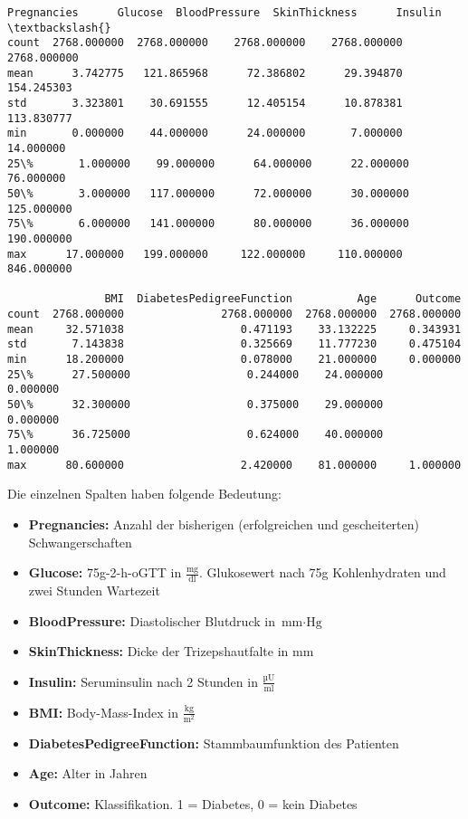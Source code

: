 \documentclass[11.5pt]{article}
\makeatletter
\providecommand{\tightlist}{%
      \setlength{\itemsep}{0pt}\setlength{\parskip}{0pt}}
\newcommand{\boxspacing}{\kern\kvtcb@left@rule\kern\kvtcb@boxsep}
\newcommand{\prompt}[4]{
        {\ttfamily\llap{{\color{#2}[#3]:\hspace{3pt}#4}}\vspace{-\baselineskip}}
    }
\makeatother
\begin{document}
            \begin{tcolorbox}[breakable, size=fbox, boxrule=.5pt, pad at break*=1mm, opacityfill=0]
\prompt{Out}{outcolor}{5}{\boxspacing}
\begin{Verbatim}[commandchars=\\\{\}]
       Pregnancies      Glucose  BloodPressure  SkinThickness      Insulin  \textbackslash{}
count  2768.000000  2768.000000    2768.000000    2768.000000  2768.000000
mean      3.742775   121.865968      72.386802      29.394870   154.245303
std       3.323801    30.691555      12.405154      10.878381   113.830777
min       0.000000    44.000000      24.000000       7.000000    14.000000
25\%       1.000000    99.000000      64.000000      22.000000    76.000000
50\%       3.000000   117.000000      72.000000      30.000000   125.000000
75\%       6.000000   141.000000      80.000000      36.000000   190.000000
max      17.000000   199.000000     122.000000     110.000000   846.000000

               BMI  DiabetesPedigreeFunction          Age      Outcome
count  2768.000000               2768.000000  2768.000000  2768.000000
mean     32.571038                  0.471193    33.132225     0.343931
std       7.143838                  0.325669    11.777230     0.475104
min      18.200000                  0.078000    21.000000     0.000000
25\%      27.500000                  0.244000    24.000000     0.000000
50\%      32.300000                  0.375000    29.000000     0.000000
75\%      36.725000                  0.624000    40.000000     1.000000
max      80.600000                  2.420000    81.000000     1.000000
\end{Verbatim}
\end{tcolorbox}
        
    Die einzelnen Spalten haben folgende Bedeutung:

\begin{itemize}
\tightlist
\item
  \textbf{Pregnancies:} Anzahl der bisherigen (erfolgreichen und
  gescheiterten) Schwangerschaften
\item
  \textbf{Glucose:} 75g-2-h-oGTT in \(\frac{\text{mg}}{\text{dl}}\).
  Glukosewert nach 75g Kohlenhydraten und zwei Stunden Wartezeit
\item
  \textbf{BloodPressure:} Diastolischer Blutdruck in
  \(\text{mm} \cdot \text{Hg}\)
\item
  \textbf{SkinThickness:} Dicke der Trizepshautfalte in \(\text{mm}\)
\item
  \textbf{Insulin:} Seruminsulin nach 2 Stunden in
  \(\frac{\text{µU}}{\text{ml}}\)
\item
  \textbf{BMI:} Body-Mass-Index in \(\frac{\text{kg}}{\text{m}^2}\)
\item
  \textbf{DiabetesPedigreeFunction:} Stammbaumfunktion des Patienten
\item
  \textbf{Age:} Alter in Jahren
\item
  \textbf{Outcome:} Klassifikation. 1 = Diabetes, 0 = kein Diabetes
\end{itemize}
\end{document}
